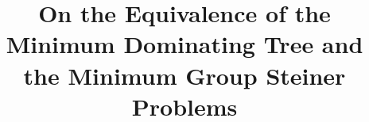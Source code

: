 \title{
On the Equivalence of the
Minimum Dominating Tree 
and the
Minimum Group Steiner
Problems
}

\date{}